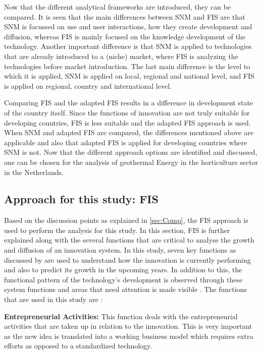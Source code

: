 Now that the different analytical frameworks are introduced, they can be compared. It is seen that the main differences between SNM and FIS are that SNM is focussed on use and user interactions, how they create development and diffusion, whereas FIS is mainly focused on the knowledge development of the technology. Another important difference is that SNM is applied to technologies that are already introduced to a (niche) market, where FIS is analyzing the technologies before market introduction. The last main difference is the level to which it is applied, SNM is applied on local, regional and national level, and FIS is applied on regional, country and international level. 

Comparing FIS and the adapted FIS results in a difference in development state of the country itself. Since the functions of innovation are not truly suitable for developing countries, FIS is less suitable and the adapted FIS approach is used. When SNM and adapted FIS are compared, the differences mentioned above are applicable and also that adapted FIS is applied for developing countries where SNM is not. Now that the different approach options are identified and discussed, one can be chosen for the analysis of geothermal Energy in the horticulture sector in the Netherlands. 

\subsection{Approach for this study: FIS  }
\label{sec:FIS}
Based on the discussion points as explained in \autoref{sec:Comp}, the FIS approach is used to perform the analysis for this study. In this section, FIS is further explained along with the several functions that are critical to analyse the growth and diffusion of an innovation system. In this study, seven key functions as discussed by \cite{FIS2009} are used to understand how the innovation is currently performing and also to predict its growth in the upcoming years. In addition to this, the functional pattern of the technology's development is observed through these system functions and areas that need attention is made visible \citep{Kamp2008}. The functions that are used in this study are \citep{FIS2009}:

\textbf{Entrepreneurial Activities:} This function deals with the entrepreneurial activities that are taken up in relation to the innovation. This is very important as the new idea is translated into a working business model which requires extra efforts as opposed to a standardized technology.

